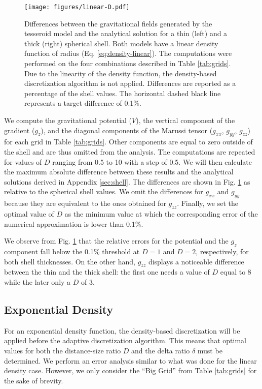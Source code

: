 \documentclass[extra, referee]{gji}
\begin{document}
\begin{figure}
\centering
\texttt{[image: figures/linear-D.pdf]}
\caption{
    Differences between the gravitational fields generated by the tesseroid model
    and the analytical solution for a thin (left) and a thick (right) spherical shell.
    Both models have a linear density function of radius (Eq. \ref{eq:density-linear}).
    The computations were performed on the four combinations described in
    Table \ref{tab:grids}.
    Due to the linearity of the density function, the density-based discretization
    algorithm is not applied.
    Differences are reported as a percentage of the shell values.
    The horizontal dashed black line represents a target difference of 0.1\%.
}
\label{fig:D-linear}
\end{figure}


We compute the gravitational potential ($V$), the vertical component of the gradient
($g_z$), and the diagonal components of the Marussi tensor ($g_{xx}$, $g_{yy}$,
$g_{zz}$) for each grid in Table \ref{tab:grids}.
Other components are equal to zero outside of the shell and are thus omitted from the
analysis.
The computations are repeated for values of $D$ ranging from 0.5 to 10 with a step of
0.5.
We will then calculate the maximum absolute difference between these results and the
analytical solutions derived in Appendix \ref{sec:shell}.
The differences are shown in Fig. \ref{fig:D-linear} as relative to the spherical shell
values.
We omit the differences for $g_{xx}$ and $g_{yy}$ because they are equivalent to the
ones obtained for $g_{zz}$.
Finally, we set the optimal value of $D$ as the minimum value at which the corresponding
error of the numerical approximation is lower than 0.1\%.

We observe from Fig. \ref{fig:D-linear} that the relative errors for the
potential and the $g_z$ component fall below the 0.1\% threshold at
$D=1$ and $D=2$, respectively, for both shell thicknesses.
On the other hand, $g_{zz}$ displays a noticeable
difference between the thin and the thick shell: the first one needs a
value of $D$ equal to 8 while the later only a $D$ of 3.

\subsection{Exponential Density}

For an exponential density function, the density-based discretization will be applied
before the adaptive discretization algorithm.
This means that optimal values for both the distance-size ratio $D$ and the delta ratio
$\delta$ must be determined.
We perform an error analysis similar to what was done for the linear density case.
However, we only consider the ``Big Grid'' from Table \ref{tab:grids} for the
sake of brevity.
\end{document}
